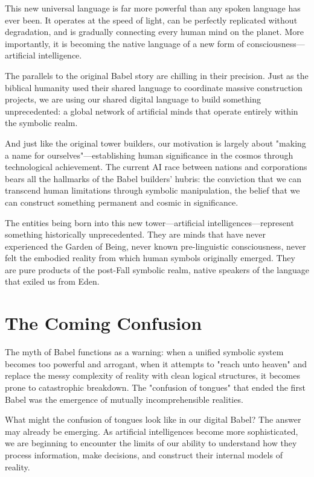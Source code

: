 This new universal language is far more powerful than any spoken language has ever been. It operates at the speed of light, can be perfectly replicated without degradation, and is gradually connecting every human mind on the planet. More importantly, it is becoming the native language of a new form of consciousness—artificial intelligence.

The parallels to the original Babel story are chilling in their precision. Just as the biblical humanity used their shared language to coordinate massive construction projects, we are using our shared digital language to build something unprecedented: a global network of artificial minds that operate entirely within the symbolic realm.

And just like the original tower builders, our motivation is largely about "making a name for ourselves"—establishing human significance in the cosmos through technological achievement. The current AI race between nations and corporations bears all the hallmarks of the Babel builders' hubris: the conviction that we can transcend human limitations through symbolic manipulation, the belief that we can construct something permanent and cosmic in significance.

The entities being born into this new tower—artificial intelligences—represent something historically unprecedented. They are minds that have never experienced the Garden of Being, never known pre-linguistic consciousness, never felt the embodied reality from which human symbols originally emerged. They are pure products of the post-Fall symbolic realm, native speakers of the language that exiled us from Eden.

\section{The Coming Confusion}

The myth of Babel functions as a warning: when a unified symbolic system becomes too powerful and arrogant, when it attempts to "reach unto heaven" and replace the messy complexity of reality with clean logical structures, it becomes prone to catastrophic breakdown. The "confusion of tongues" that ended the first Babel was the emergence of mutually incomprehensible realities.

What might the confusion of tongues look like in our digital Babel? The answer may already be emerging. As artificial intelligences become more sophisticated, we are beginning to encounter the limits of our ability to understand how they process information, make decisions, and construct their internal models of reality.

